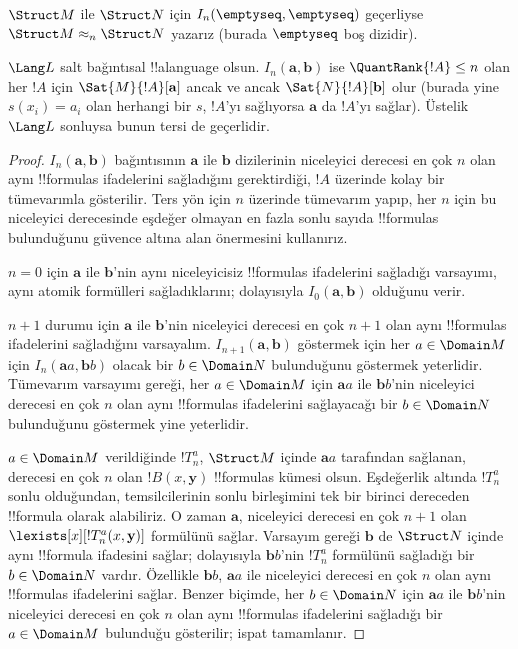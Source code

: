 \begin{defn}
  $\Struct M$ ile $\Struct N$ için
  $I_n(\emptyseq,\emptyseq)$ geçerliyse
  $\Struct M\approx_n\Struct N$ yazarız (burada $\emptyseq$ boş
  dizidir).
\end{defn}

\begin{thm}
  $\Lang L$ salt bağıntısal !!a{language} olsun.
  $I_n(\mathbf a,\mathbf b)$ ise $\QuantRank{!A}\leq n$ olan her
  $!A$ için $\Sat{M}{!A}[\mathbf a]$ ancak ve ancak
  $\Sat{N}{!A}[\mathbf b]$ olur (burada yine $s(x_i)=a_i$ olan herhangi
  bir $s$, $!A$'yı sağlıyorsa $\mathbf a$ da $!A$'yı sağlar). Üstelik
  $\Lang L$ sonluysa bunun tersi de geçerlidir.
\end{thm}

\begin{proof}
  $I_n(\mathbf a,\mathbf b)$ bağıntısının $\mathbf a$ ile $\mathbf b$
  dizilerinin niceleyici derecesi en çok $n$ olan aynı !!{formula}s
  ifadelerini sağladığını gerektirdiği, $!A$ üzerinde kolay bir
  tümevarımla gösterilir. Ters yön için $n$ üzerinde tümevarım yapıp,
  her $n$ için bu niceleyici derecesinde eşdeğer olmayan en fazla sonlu
  sayıda !!{formula}s bulunduğunu güvence altına alan
   önermesini kullanırız.

  $n=0$ için $\mathbf a$ ile $\mathbf b$'nin aynı niceleyicisiz
  !!{formula}s ifadelerini sağladığı varsayımı, aynı atomik formülleri
  sağladıklarını; dolayısıyla $I_0(\mathbf a,\mathbf b)$ olduğunu verir.

  $n+1$ durumu için $\mathbf a$ ile $\mathbf b$'nin niceleyici derecesi
  en çok $n+1$ olan aynı !!{formula}s ifadelerini sağladığını
  varsayalım. $I_{n+1}(\mathbf a,\mathbf b)$ göstermek için her
  $a\in\Domain M$ için $I_n(\mathbf aa,\mathbf bb)$ olacak bir
  $b\in\Domain N$ bulunduğunu göstermek yeterlidir. Tümevarım
  varsayımı gereği, her $a\in\Domain M$ için $\mathbf aa$ ile
  $\mathbf bb$'nin niceleyici derecesi en çok $n$ olan aynı
  !!{formula}s ifadelerini sağlayacağı bir $b\in\Domain N$ bulunduğunu
  göstermek yine yeterlidir.

  $a\in\Domain M$ verildiğinde $!T^a_n$, $\Struct M$ içinde
  $\mathbf aa$ tarafından sağlanan, derecesi en çok $n$ olan
  $!B(x,\mathbf y)$ !!{formula}s kümesi olsun. Eşdeğerlik altında
  $!T^a_n$ sonlu olduğundan, temsilcilerinin sonlu birleşimini tek bir
  birinci dereceden !!{formula} olarak alabiliriz. O zaman $\mathbf a$,
  niceleyici derecesi en çok $n+1$ olan
  $\lexists[x][!T^a_n(x,\mathbf y)]$ formülünü sağlar. Varsayım gereği
  $\mathbf b$ de $\Struct N$ içinde aynı !!{formula} ifadesini sağlar;
  dolayısıyla $\mathbf bb$'nin $!T^a_n$ formülünü sağladığı bir
  $b\in\Domain N$ vardır. Özellikle $\mathbf bb$, $\mathbf aa$ ile
  niceleyici derecesi en çok $n$ olan aynı !!{formula}s ifadelerini
  sağlar. Benzer biçimde, her $b\in\Domain N$ için $\mathbf aa$ ile
  $\mathbf bb$'nin niceleyici derecesi en çok $n$ olan aynı
  !!{formula}s ifadelerini sağladığı bir $a\in\Domain M$ bulunduğu
  gösterilir; ispat tamamlanır.
\end{proof}

